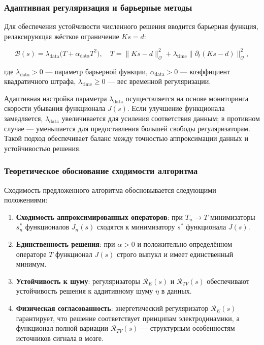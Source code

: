 \documentclass[sn-mathphys-num]{bst/sn-jnl}
\theoremstyle{thmstylethree}
\theoremstyle{thmstyletwo}
\theoremstyle{thmstyleone}
\begin{document}
\subsubsection{Адаптивная регуляризация и барьерные методы}

Для обеспечения устойчивости численного решения вводится барьерная функция, релаксирующая жёсткое ограничение $Ks = d$:

\begin{equation}
    \mathcal{B}(s) = \lambda_{\mathrm{data}} \bigl(T + \alpha_{\mathrm{data}} T^2\bigr),
    \quad T = \|Ks - d\|_{\mathcal{O}}^2 + \lambda_{\mathrm{time}} \|\partial_t (Ks - d)\|_{\mathcal{O}}^2,
\end{equation}

где $\lambda_{\mathrm{data}} > 0$ --- параметр барьерной функции, $\alpha_{\mathrm{data}} > 0$ --- коэффициент квадратичного штрафа, $\lambda_{\mathrm{time}} \geq 0$ --- вес временной регуляризации.

Адаптивная настройка параметра $\lambda_{\mathrm{data}}$ осуществляется на основе мониторинга скорости убывания функционала $J(s)$. Если улучшение функционала замедляется, $\lambda_{\mathrm{data}}$ увеличивается для усиления соответствия данным; в противном случае --- уменьшается для предоставления большей свободы регуляризаторам. Такой подход обеспечивает баланс между точностью аппроксимации данных и устойчивостью решения.

\subsubsection{Теоретическое обоснование сходимости алгоритма}

Сходимость предложенного алгоритма обосновывается следующими положениями:
\begin{enumerate}
    \item \textbf{Сходимость аппроксимированных операторов}: при $T_n \to T$ минимизаторы $s_n^*$ функционалов $J_n(s)$ сходятся к минимизатору $s^*$ функционала $J(s)$.
    \item \textbf{Единственность решения}: при $\alpha > 0$ и положительно определённом операторе $T$ функционал $J(s)$ строго выпукл и имеет единственный минимум.
    \item \textbf{Устойчивость к шуму}: регуляризаторы $\mathcal{R}_E(s)$ и $\mathcal{R}_{TV}(s)$ обеспечивают устойчивость решения к аддитивному шуму $\eta$ в данных.
    \item \textbf{Физическая согласованность}: энергетический регуляризатор $\mathcal{R}_E(s)$ гарантирует, что решение соответствует принципам электродинамики, а функционал полной вариации $\mathcal{R}_{TV}(s)$ --- структурным особенностям источников сигнала в мозге.
\end{enumerate}
\end{document}
